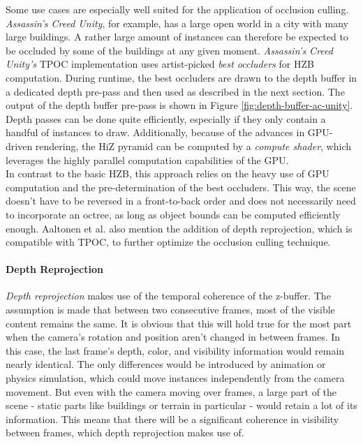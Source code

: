 \noindent
Some use cases are especially well suited for the application of occlusion culling. \emph{Assassin's Creed Unity}, for 
example, has a large open world in a city with many large buildings. A rather large amount of instances can therefore be 
expected to be occluded by some of the buildings at any given moment. \emph{Assassin's Creed Unity's} \ac{TPOC} 
implementation uses artist-picked \emph{best occluders} for \ac{HZB} computation. During runtime, the best occluders are 
drawn to the depth buffer in a dedicated depth pre-pass and then used as described in the next section. 
The output of the depth buffer pre-pass is shown in Figure \ref{fig:depth-buffer-ac-unity}. Depth passes can be done 
quite efficiently, especially if they only contain a handful of instances to draw. Additionally, because of the advances 
in \ac{GPU}-driven rendering, the \ac{HiZ} pyramid can be computed by a \emph{compute shader}, which leverages the 
highly parallel computation capabilities of the \ac{GPU}. \\

\noindent
In contrast to the basic \ac{HZB}, this approach relies on the heavy use of \ac{GPU} computation and the 
pre-determination of the best occluders. This way, the scene doesn't have to be reversed in a front-to-back order 
and does not necessarily need to incorporate an octree, as long as object bounds can be computed efficiently enough.
Aaltonen et al. \cite{Aaltonen2015} also mention the addition of depth reprojection, which is compatible with 
\ac{TPOC}, to further optimize the occlusion culling technique.


\paragraph*{Depth Reprojection} \label{subsubsec-depth-reprojection}

\emph{Depth reprojection} makes use of the temporal coherence of the z-buffer. The assumption is made that 
between two consecutive frames, most of the visible content remains the same. It is obvious that this will 
hold true for the most part when the camera's rotation and position aren't changed in between frames. In 
this case, the last frame's depth, color, and visibility information would remain nearly identical. The only 
differences would be introduced by animation or physics simulation, which could move instances independently 
from the camera movement. But even with the camera moving over frames, a large part of the scene - static 
parts like buildings or terrain in particular - would retain a lot of its information. This means that there 
will be a significant coherence in visibility between frames, which depth reprojection makes use of. \\
\enlargethispage{\baselineskip}
\enlargethispage{\baselineskip}

